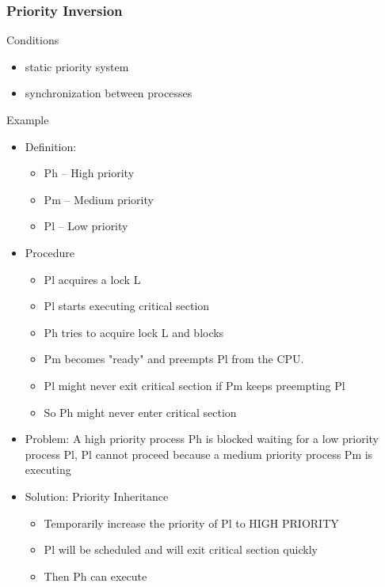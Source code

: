 \documentclass[12pt]{article}
\begin{document}
\subsubsection{Priority Inversion}
Conditions
\begin{itemize}
    \item static priority system
    \item synchronization between processes
\end{itemize}
Example
\begin{itemize}
    \item Definition: \begin{itemize}
        \item Ph – High priority 
        \item Pm – Medium priority 
        \item Pl – Low priority
    \end{itemize}
    \item Procedure \begin{itemize}
        \item Pl acquires a lock L 
        \item Pl starts executing critical section 
        \item Ph tries to acquire lock L and blocks 
        \item Pm becomes "ready" and preempts Pl from the CPU. 
        \item Pl might never exit critical section if Pm keeps preempting Pl
        \item So Ph might never enter critical section
    \end{itemize}
    \item Problem: A high priority process Ph is blocked waiting for a low priority process Pl, Pl cannot proceed because a medium priority process Pm is executing
    \item Solution: Priority Inheritance \begin{itemize}
        \item Temporarily increase the priority of Pl to HIGH PRIORITY 
        \item Pl will be scheduled and will exit critical section quickly 
        \item Then Ph can execute
    \end{itemize}
\end{itemize}
\end{document}
